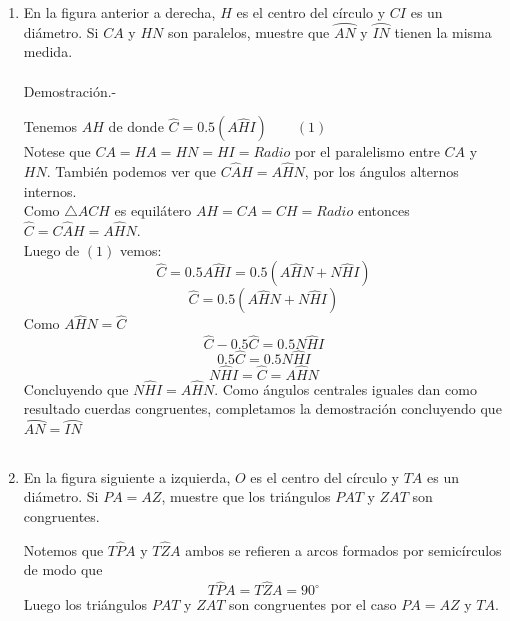 \documentclass[10pt]{article}
\begin{document}
\begin{enumerate}
\item En la figura anterior a derecha, $H$ es el centro del círculo y $CI$ es un diámetro. Si $CA$ y $HN$ son paralelos, muestre que $\wideparen{AN}$ y $\wideparen{IN}$ tienen la misma medida.\\\\
    Demostración.-\; 
    \begin{center}
    \end{center}
    Tenemos $AH$ de donde $\widehat{C}=0.5 (A\widehat{H}I) \qquad (1)$\\
    Notese que $CA=HA=HN=HI=Radio$ por el paralelismo entre $CA$ y $HN$. También podemos ver que $C\widehat{A}H=A\widehat{H}N$, por los ángulos alternos internos.\\
    Como $\triangle ACH$ es equilátero $AH=CA=CH=Radio$ entonces $\widehat{C}=C\widehat{A}H = A\widehat{H}N$.\\
    Luego de $(1)$ vemos: $$\widehat{C} = 0.5 A\widehat{H}I = 0.5(A\widehat{H}N + N\widehat{H}I)$$ $$\widehat{C} = 0.5(A\widehat{H}N + N\widehat{H}I)$$
    Como $A\widehat{H}N=\widehat{C}$ $$\widehat{C} - 0.5 \widehat{C}=0.5N\widehat{H}I$$ $$0.5\widehat{C} = 0.5N\widehat{H}I$$
    $$N\widehat{H}I=\widehat{C}=A\widehat{H}N$$ Concluyendo que $N\widehat{H}I=A\widehat{H}N$. Como ángulos centrales iguales dan como resultado cuerdas congruentes, completamos la demostración concluyendo que $\wideparen{AN} = \wideparen{IN}$\\\\

\item  En la figura siguiente a izquierda, $O$ es el centro del círculo y $TA$ es un diámetro. Si $PA = AZ$, muestre que los triángulos $PAT$ y $ZAT$ son congruentes.
    \begin{center}
    \end{center}
    Notemos que $T\widehat{P}A$ y $T\widehat{Z}A$ ambos se refieren a arcos formados por semicírculos de modo que $$T\widehat{P}A=T\widehat{Z}A=90^{\circ}$$ 
    Luego los triángulos $PAT$ y $ZAT$ son congruentes por el caso $PA=AZ$ y $TA$.\\\\


\end{enumerate}
\end{document}
